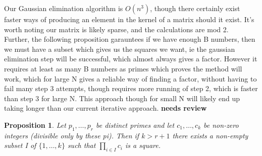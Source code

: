 \documentclass[10pt,a4paper]{report}
\newtheorem*{prop}{Proposition}
\begin{document}
Our Gaussian elimination algorithm is $O(n^3)$, though there certainly exist faster ways of producing an element in the kernel of a matrix should it exist. It's worth noting our matrix is likely sparse, and the calculations are mod 2.\\ 


Further, the following proposition garauntees if we have enough B numbers, then we must have a subset which gives us the squares we want, ie the gaussian elimination step will be successful, which almost always gives a factor. However it requires at least as many B numbers as primes which proves the method will work, which for large N gives a reliable way of finding a factor, without having to fail many step 3 attempts, though requires more running of step 2, which is faster than step 3 for large N. This approach though for small N will likely end up taking longer than our current iterative approach. \textbf{needs review}

\begin{prop}
Let $p_1,\dots, p_r$ be distinct primes and let $c_1, \dots, c_k$ be non-zero integers (divisible only by these pi). Then if $k > r + 1$ there exists a non-empty subset I of $\{1,\dots, k\}$ such that $\prod_{i\in I} c_i$ is a square.
\end{prop}
\end{document}
